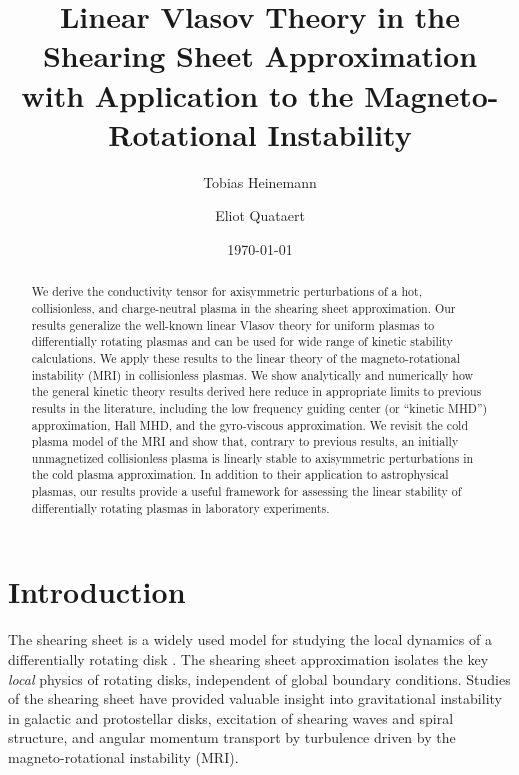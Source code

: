 \documentclass[aps,pre,notitlepage,amsmath,amssymb,amsfonts,nobibnotes,nofootinbib,superscriptaddress]{revtex4-1}
\begin{document}
\title{Linear Vlasov Theory in the Shearing Sheet Approximation \\
  with Application to the Magneto-Rotational Instability}

\author{Tobias Heinemann}
\author{Eliot Quataert}

\date{\today}

\begin{abstract}

We derive the conductivity tensor for axisymmetric perturbations of a hot,
collisionless, and charge-neutral plasma in the shearing sheet approximation.
Our results generalize the well-known linear Vlasov theory for uniform plasmas
to differentially rotating plasmas and can be used for wide range of kinetic
stability calculations. We apply these results to the linear theory of the
magneto-rotational instability (MRI) in collisionless plasmas. We show
analytically and numerically how the general kinetic theory results derived
here reduce in appropriate limits to previous results in the literature,
including the low frequency guiding center (or ``kinetic MHD'') approximation,
Hall MHD, and the gyro-viscous approximation. We revisit the cold plasma model
of the MRI and show that, contrary to previous results, an initially
unmagnetized collisionless plasma is linearly stable to axisymmetric
perturbations in the cold plasma approximation. In addition to their
application to astrophysical plasmas, our results provide a useful framework
for assessing the linear stability of differentially rotating plasmas in
laboratory experiments.

\end{abstract}

\maketitle

\section{Introduction}

The shearing sheet is a widely used model for studying the local dynamics of a
differentially rotating disk
\citep[e.g.][]{Hill1878,Goldreich1965,Hawley1996}. The shearing sheet
approximation isolates the key \emph{local} physics of rotating disks,
independent of global boundary conditions. Studies of the shearing sheet have
provided valuable insight into gravitational instability in galactic and
protostellar disks, excitation of shearing waves and spiral structure, and
angular momentum transport by turbulence driven by the magneto-rotational
instability (MRI).
\end{document}
